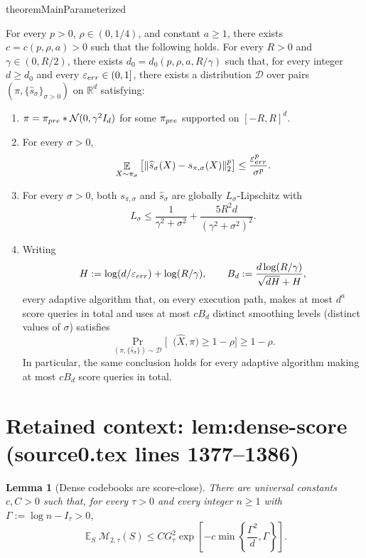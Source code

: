 \documentclass[10pt,a4paper]{amsart}
\DeclareMathOperator*{\E}{\mathbb{E}}
\DeclareMathOperator{\TV}{d_{\mathrm{TV}}}
\theoremstyle{plain}
\newtheorem{lemma}[theorem]{Lemma}
\theoremstyle{definition}
\theoremstyle{remark}
\begin{document}
\begin{restatable}{theorem}{MainParameterized}
  \label{thm:main_parameterized}

For every $p>0$, $\rho\in(0,1/4)$, and constant $a\ge1$, there exists
  $c=c(p,\rho,a)>0$ such that the following holds.
  For every $R>0$ and $\gamma\in(0,R/2)$, there exists
  $d_0=d_0(p,\rho,a,R/\gamma)$ such that, for every integer
  $d\ge d_0$ and every $\varepsilon_{\rm err}\in(0,1]$, there exists a distribution
  $\mathcal D$ over pairs
  $(\pi,\{\widehat s_\sigma\}_{\sigma>0})$ on $\mathbb R^d$
  satisfying:
  \begin{enumerate}[label=(\arabic*)]
    \item $\pi=\pi_{\rm pre}*\mathcal N(0,\gamma^2I_d)$ for some
      $\pi_{\rm pre}$ supported on $[-R,R]^d$.

    \item For every $\sigma>0$,
      \[
        \E_{X\sim \pi_\sigma}
        \big[\|\widehat s_\sigma(X)-s_{\pi,\sigma}(X)\|_2^p\big]
        \le \frac{\varepsilon_{\rm err}^p}{\sigma^p}.
      \]

    \item For every $\sigma>0$, both $s_{\pi,\sigma}$ and
      $\widehat s_\sigma$ are globally $L_\sigma$-Lipschitz with
      \[
        L_\sigma\le \frac{1}{\gamma^2+\sigma^2}
        +\frac{5R^2d}{(\gamma^2+\sigma^2)^2}.
      \]

    \item Writing
      \[
        H:=\log(d/\varepsilon_{\rm err})+\log(R/\gamma),
        \qquad
        B_d:=\frac{d\log(R/\gamma)}{\sqrt{dH}+H},
      \]
      every adaptive algorithm that, on every execution path, makes at
      most $d^a$ score queries in total and uses at most $cB_d$ distinct
      smoothing levels (distinct values of $\sigma$) satisfies
      \[
        \Pr_{(\pi,\{\widehat s_\sigma\})\sim\mathcal D}
        \Big[\TV\big(\widehat X,\pi\big)\ge 1-\rho\Big]
        \ge 1-\rho.
      \]
      In particular, the same conclusion holds for every adaptive
      algorithm making at most $cB_d$ score queries in total.
  \end{enumerate}
    \end{restatable}


\section*{Retained context: lem:dense-score (source0.tex lines 1377--1386)}

\begin{lemma}[Dense codebooks are score-close]\label{lem:dense-score}
There are universal constants \(c,C>0\) such that, for every
\(\tau>0\) and every integer \(n\ge1\) with
\(\Gamma:=\log n-I_\tau>0\),
\[
   \E_S\mathcal M_{2,\tau}(S)
   \le C G_\tau^2
      \exp\left[-c\min\left\{\frac{\Gamma^2}{d},\Gamma\right\}\right].
\]
\end{lemma}
\end{document}
